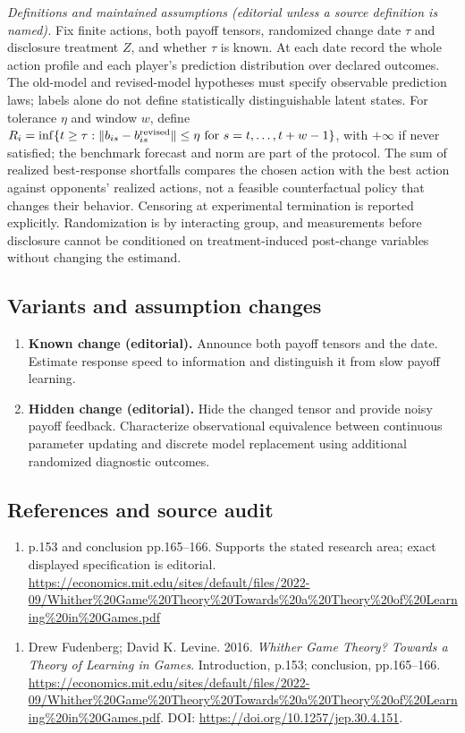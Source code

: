 \documentclass[11pt,a4paper]{article}
\begin{document}
\emph{Definitions and maintained assumptions (editorial unless a source definition is named).} Fix finite actions, both payoff tensors, randomized change date \(\tau\) and disclosure treatment \(Z\), and whether \(\tau\) is known. At each date record the whole action profile and each player’s prediction distribution over declared outcomes. The old-model and revised-model hypotheses must specify observable prediction laws; labels alone do not define statistically distinguishable latent states. For tolerance \(\eta\) and window \(w\), define \(R_i=\inf\{t\ge\tau:\|b_{is}-b^{\rm revised}_{is}\|\le\eta\text{ for }s=t,\ldots,t+w-1\}\), with \(+\infty\) if never satisfied; the benchmark forecast and norm are part of the protocol. The sum of realized best-response shortfalls compares the chosen action with the best action against opponents’ realized actions, not a feasible counterfactual policy that changes their behavior. Censoring at experimental termination is reported explicitly. Randomization is by interacting group, and measurements before disclosure cannot be conditioned on treatment-induced post-change variables without changing the estimand.
\subsection*{Variants and assumption changes}
\begin{enumerate}
\item \textbf{Known change (editorial).} Announce both payoff tensors and the date. Estimate response speed to information and distinguish it from slow payoff learning.
\item \textbf{Hidden change (editorial).} Hide the changed tensor and provide noisy payoff feedback. Characterize observational equivalence between continuous parameter updating and discrete model replacement using additional randomized diagnostic outcomes.
\end{enumerate}
\subsection*{References and source audit}
\begin{enumerate}
\item p.153 and conclusion pp.165–166. Supports the stated research area; exact displayed specification is editorial. \url{https://economics.mit.edu/sites/default/files/2022-09/Whither%20Game%20Theory%20Towards%20a%20Theory%20of%20Learning%20in%20Games.pdf}
\end{enumerate}
\begin{enumerate}\raggedright
\item\hypertarget{definitions:source:30007565:1}{} Drew Fudenberg; David K. Levine. 2016. \emph{Whither Game Theory? Towards a Theory of Learning in Games}. Introduction, p.153; conclusion, pp.165–166.
\url{https://economics.mit.edu/sites/default/files/2022-09/Whither%20Game%20Theory%20Towards%20a%20Theory%20of%20Learning%20in%20Games.pdf}.
DOI: \url{https://doi.org/10.1257/jep.30.4.151}.
\end{enumerate}
\end{document}
